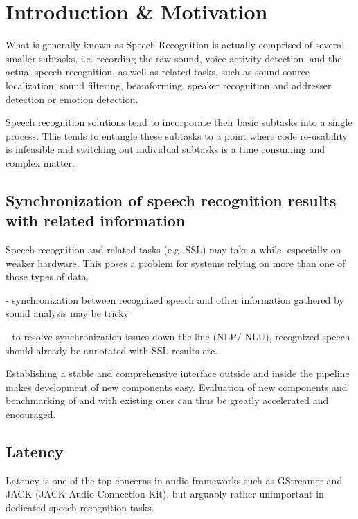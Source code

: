 
\chapter{Introduction \& Motivation}

What is generally known as Speech Recognition is actually comprised of several smaller subtasks, i.e. recording the raw sound, voice activity detection, and the actual speech recognition, as well as related tasks, such as sound source localization, sound filtering, beamforming, speaker recognition and addresser detection or emotion detection. %

Speech recognition solutions tend to incorporate their basic subtasks into a single process.
This tends to entangle these subtasks to a point where code re-usability is infeasible and switching out individual subtasks is a time consuming and complex matter.

\section{Synchronization of speech recognition results with related information}

Speech recognition and related tasks (e.g. SSL) may take a while, especially on weaker hardware. 
This poses a problem for systems relying on more than one of those types of data. 

- synchronization between recognized speech and other information gathered by sound analysis may be tricky

- to resolve synchronization issues down the line (NLP/ NLU), recognized speech should already be annotated with SSL results etc.

Establishing a stable and comprehensive interface outside and inside the pipeline makes development of new components easy. 
Evaluation of new components and benchmarking of and with existing ones can thus be greatly accelerated and encouraged.%

\section{Latency}
Latency is one of the top concerns in audio frameworks such as GStreamer and JACK (JACK Audio Connection Kit), but arguably rather unimportant in dedicated speech recognition tasks. 
	
